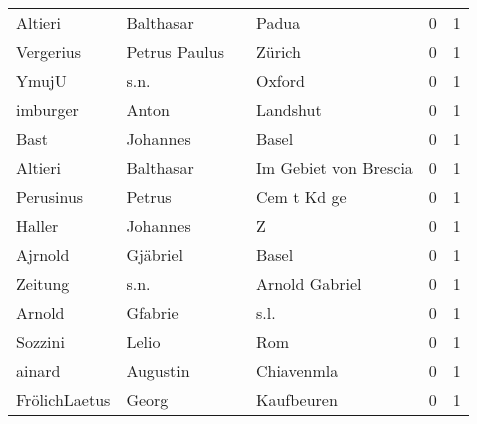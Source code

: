\begin{tabular}{llllrr}
                  Altieri &                          Balthasar &             &                                       Padua &          0 &         1 \\
                Vergerius &                      Petrus Paulus &             &                                      Zürich &          0 &         1 \\
                    YmujU &                               s.n. &             &                                      Oxford &          0 &         1 \\
                 imburger &                              Anton &             &                                    Landshut &          0 &         1 \\
                     Bast &                           Johannes &             &                                       Basel &          0 &         1 \\
                  Altieri &                          Balthasar &             &                       Im Gebiet von Brescia &          0 &         1 \\
                Perusinus &                             Petrus &             &                                 Cem t Kd ge &          0 &         1 \\
                   Haller &                           Johannes &             &                                           Z &          0 &         1 \\
                  Ajrnold &                           Gjäbriel &             &                                       Basel &          0 &         1 \\
                  Zeitung &                               s.n. &             &                              Arnold Gabriel &          0 &         1 \\
                   Arnold &                            Gfabrie &             &                                        s.l. &          0 &         1 \\
                  Sozzini &                              Lelio &             &                                         Rom &          0 &         1 \\
                   ainard &                           Augustin &             &                                  Chiavenmla &          0 &         1 \\
            FrölichLaetus &                              Georg &             &                                  Kaufbeuren &          0 &         1 \\

\end{tabular}
